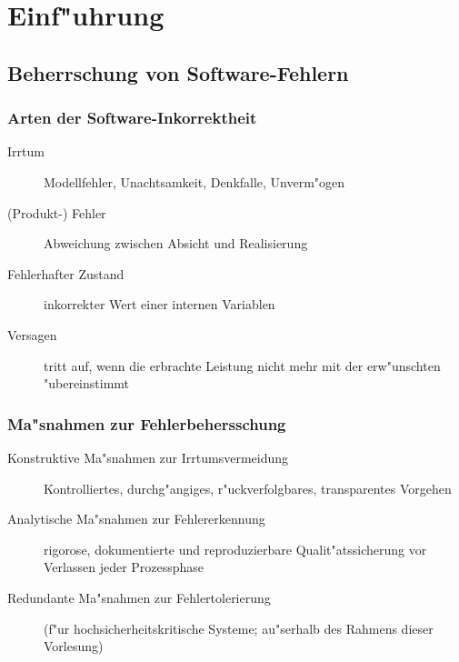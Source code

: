 


\section{Einf"uhrung}

\subsection{Beherrschung von Software-Fehlern}

\subsubsection{Arten der Software-Inkorrektheit}


\begin{figure}
\end{figure}

\begin{description}
    \item[Irrtum] Modellfehler, Unachtsamkeit, Denkfalle, Unverm"ogen
    \item[(Produkt-) Fehler] Abweichung zwischen Absicht und Realisierung
    \item[Fehlerhafter Zustand] inkorrekter Wert einer internen Variablen
    \item[Versagen] tritt auf, wenn die erbrachte Leistung nicht mehr mit der erw"unschten "ubereinstimmt
\end{description}

\clearpage


\subsubsection{Ma"snahmen zur Fehlerbehersschung}

\begin{description}
    \item[Konstruktive Ma"snahmen zur Irrtumsvermeidung] Kontrolliertes, durchg"angiges, r"uckverfolgbares, transparentes Vorgehen
    \item[Analytische Ma"snahmen zur Fehlererkennung] rigorose, dokumentierte und reproduzierbare Qualit"atssicherung vor Verlassen jeder Prozessphase
    \item[Redundante Ma"snahmen zur Fehlertolerierung] (f"ur hochsicherheitskritische Systeme; au"serhalb des Rahmens dieser Vorlesung)
\end{description}



